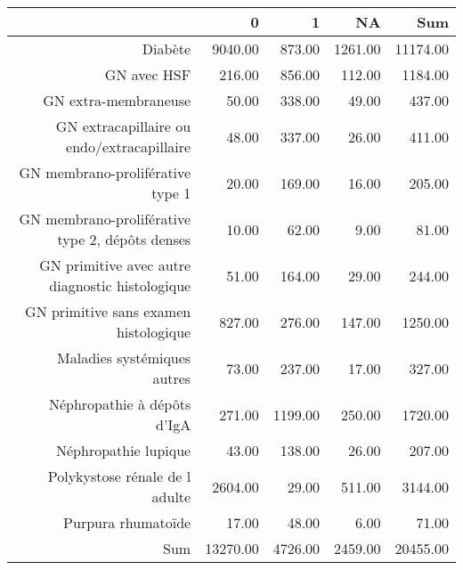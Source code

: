 \documentclass[11pt,a4paper]{article}\usepackage[]{graphicx}\usepackage[]{color}
\begin{document}
\begin{table}[H]
\centering
\begin{tabular}{rrrrr}
  \hline
 & 0 & 1 & NA & Sum \\ 
  \hline
Diabète & 9040.00 & 873.00 & 1261.00 & 11174.00 \\ 
  GN avec HSF & 216.00 & 856.00 & 112.00 & 1184.00 \\ 
  GN extra-membraneuse & 50.00 & 338.00 & 49.00 & 437.00 \\ 
  GN extracapillaire ou endo/extracapillaire & 48.00 & 337.00 & 26.00 & 411.00 \\ 
  GN membrano-proliférative type 1 & 20.00 & 169.00 & 16.00 & 205.00 \\ 
  GN membrano-proliférative type 2, dépôts denses & 10.00 & 62.00 & 9.00 & 81.00 \\ 
  GN primitive avec autre diagnostic histologique & 51.00 & 164.00 & 29.00 & 244.00 \\ 
  GN primitive sans examen histologique & 827.00 & 276.00 & 147.00 & 1250.00 \\ 
  Maladies systémiques autres & 73.00 & 237.00 & 17.00 & 327.00 \\ 
  Néphropathie à dépôts d'IgA & 271.00 & 1199.00 & 250.00 & 1720.00 \\ 
  Néphropathie lupique & 43.00 & 138.00 & 26.00 & 207.00 \\ 
  Polykystose rénale de l adulte & 2604.00 & 29.00 & 511.00 & 3144.00 \\ 
  Purpura rhumatoïde & 17.00 & 48.00 & 6.00 & 71.00 \\ 
  Sum & 13270.00 & 4726.00 & 2459.00 & 20455.00 \\ 
   \hline
\end{tabular}
\end{table}
\end{document}
